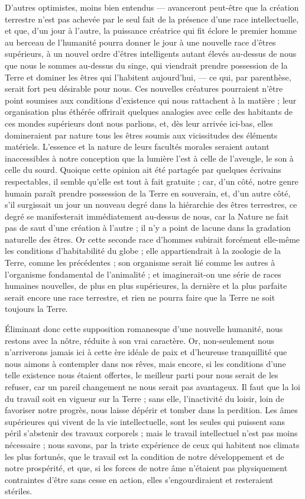 \documentclass[a4paper, 11pt, oneside]{article}
\begin{document}
D'autres optimistes, moins bien entendus --- avanceront peut-être que la création terrestre n'est pas achevée par le seul fait de la présence d'une race intellectuelle, et que, d'un jour à l'autre, la puissance créatrice qui fit éclore le premier homme au berceau de l'humanité pourra donner le jour à une nouvelle race d'êtres supérieurs, à un nouvel ordre d'êtres intelligents autant élevés au-dessus de nous que nous le sommes au-dessus du singe, qui viendrait prendre possession de la Terre et dominer les êtres qui l'habitent aujourd'hui, --- ce qui, par parenthèse, serait fort peu désirable pour nous. Ces nouvelles créatures pourraient n'être point soumises aux conditions d'existence qui nous rattachent à la matière ; leur organisation plus éthérée offrirait quelques analogies avec celle des habitants de ces mondes supérieurs dont nous parlions, et, dès leur arrivée ici-bas, elles domineraient par nature tous les êtres soumis aux vicissitudes des éléments matériels. L'essence et la nature de leurs facultés morales seraient autant inaccessibles à notre conception que la lumière l'est à celle de l'aveugle, le son à celle du sourd. Quoique cette opinion ait été partagée par quelques écrivains respectables, il semble qu'elle est tout à fait gratuite ; car, d'un côté, notre genre humain paraît prendre possession de la Terre en souverain, et, d'un autre côté, s'il surgissait un jour un nouveau degré dans la hiérarchie des êtres terrestres, ce degré se manifesterait immédiatement au-dessus de nous, car la Nature ne fait pas de saut d'une création à l'autre ; il n'y a point de lacune dans la gradation naturelle des êtres. Or cette seconde race d'hommes subirait forcément elle-même les conditions d'habitabilité du globe ; elle appartiendrait à la zoologie de la Terre, comme les précédentes ; son organisme serait lié comme les autres à l'organisme fondamental de l'animalité ; et imaginerait-on une série de races humaines nouvelles, de plus en plus supérieures, la dernière et la plus parfaite serait encore une race terrestre, et rien ne pourra faire que la Terre ne soit toujours la Terre.

Éliminant donc cette supposition romanesque d'une nouvelle humanité, nous restons avec la nôtre, réduite à son vrai caractère. Or, non-seulement nous n'arriverons jamais ici à cette ère idéale de paix et d'heureuse tranquillité que nous aimons à contempler dans nos rêves, mais encore, si les conditions d'une telle existence nous étaient offertes, le meilleur parti pour nous serait de les refuser, car un pareil changement ne nous serait pas avantageux. Il faut que la loi du travail soit en vigueur sur la Terre ; sans elle, l'inactivité du loisir, loin de favoriser notre progrès, nous laisse dépérir et tomber dans la perdition. Les âmes supérieures qui vivent de la vie intellectuelle, sont les seules qui puissent sans péril s'abstenir des travaux corporels ; mais le travail intellectuel n'est pas moins nécessaire ; nous savons, par la triste expérience de ceux qui habitent nos climats les plus fortunés, que le travail est la condition de notre développement et de notre prospérité, et que, si les forces de notre âme n'étaient pas physiquement contraintes d'être sans cesse en action, elles s'engourdiraient et resteraient stériles.
\end{document}
